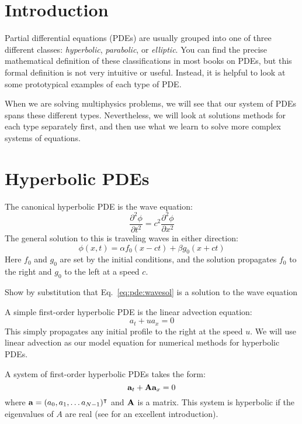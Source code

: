 \section{Introduction}

Partial differential equations (PDEs) are usually grouped into one of
three different classes: {\em hyperbolic}, {\em parabolic}, or {\em
  elliptic}.  You can find the precise mathematical definition of
these classifications in most books on PDEs, but this formal
definition is not very intuitive or useful.  Instead, it is helpful to
look at some prototypical examples of each type of PDE.

When we are solving multiphysics problems, we will see that our 
system of PDEs spans these different types.  Nevertheless, we will
look at solutions methods for each type separately first, and then
use what we learn to solve more complex systems of equations.

\section{Hyperbolic PDEs}

The canonical hyperbolic PDE is the wave equation:
\begin{equation}
  \frac{\partial^2 \phi}{\partial t^2} = c^2 \frac{\partial^2 \phi}{\partial x^2}
\end{equation}   
The general solution to this is traveling waves in either direction:
\begin{equation}
\label{eq:pde:wavesol}
  \phi(x,t) = \alpha f_0(x - ct) + \beta g_0(x + ct)
\end{equation}
Here $f_0$ and $g_0$ are set by the initial
conditions, and the solution propagates $f_0$ to the right and $g_0$ to
the left at a speed $c$.

\begin{exercise}
{Show by substitution that Eq.~\ref{eq:pde:wavesol} is a solution
to the wave equation}
\end{exercise}

A simple first-order hyperbolic PDE is the linear advection equation:
\begin{equation}
a_t + u a_x = 0
\end{equation}
This simply propagates any initial profile to the right at the speed
$u$.  We will use linear advection as our model equation for numerical
methods for hyperbolic PDEs.

A system of first-order hyperbolic PDEs takes the form:
\begin{equation}
{\bf a}_t + {\bf A} {\bf a}_x = 0
\end{equation}
where ${\bf a} = (a_0, a_1, \ldots a_{N-1})^\intercal$ and ${\bf A}$ is a matrix.
This system is hyperbolic if the eigenvalues of $A$ are real (see
\cite{leveque:2002} for an excellent introduction).

